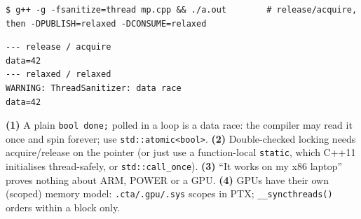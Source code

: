 \documentclass[10pt,a4paper,openany,oneside]{report}
\begin{document}
\begin{lstlisting}[style=shcmd]
$ g++ -g -fsanitize=thread mp.cpp && ./a.out        # release/acquire, then -DPUBLISH=relaxed -DCONSUME=relaxed
\end{lstlisting}
\begin{lstlisting}[style=out]
--- release / acquire
data=42
--- relaxed / relaxed
WARNING: ThreadSanitizer: data race 
data=42
\end{lstlisting}
\begin{trapbox}
\textbf{(1)} A plain \texttt{bool done;} polled in a loop is a data race: the compiler may read it once and spin forever; use \texttt{std::atomic<bool>}. \textbf{(2)} Double-checked locking needs acquire/release on the pointer (or just use a function-local \texttt{static}, which C++11 initialises thread-safely, or \texttt{std::call\_once}). \textbf{(3)} ``It works on my x86 laptop'' proves nothing about ARM, POWER or a GPU. \textbf{(4)} GPUs have their own (scoped) memory model: \texttt{.cta/.gpu/.sys} scopes in PTX; \texttt{\_\_syncthreads()} orders within a block only.
\end{trapbox}
\end{document}
